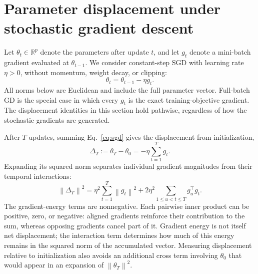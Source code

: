 \documentclass[11pt]{article}
\newcommand{\norm}[1]{\left\lVert#1\right\rVert}
\begin{document}
\section{Parameter displacement under stochastic gradient descent}

Let $\theta_t\in\mathbb{R}^p$ denote the parameters after update $t$, and let
$g_t$ denote a mini-batch gradient evaluated at $\theta_{t-1}$. We consider
constant-step SGD with learning rate $\eta>0$, without momentum, weight decay,
or clipping:
\begin{equation}
  \theta_t=\theta_{t-1}-\eta g_t.
  \label{eq:sgd}
\end{equation}
All norms below are Euclidean and include the full parameter vector. Full-batch
GD is the special case in which every $g_t$ is the exact training-objective
gradient. The displacement identities in this section hold pathwise, regardless
of how the stochastic gradients are generated.

After $T$ updates, summing Eq.~\eqref{eq:sgd} gives the displacement from
initialization,
\begin{equation}
  \Delta_T:=\theta_T-\theta_0=-\eta\sum_{t=1}^T g_t.
  \label{eq:displacement}
\end{equation}
Expanding its squared norm separates individual gradient magnitudes from their
temporal interactions:
\begin{equation}
  \boxed{\norm{\Delta_T}^2
  =\eta^2\sum_{t=1}^T\norm{g_t}^2
   +2\eta^2\sum_{1\leq u<t\leq T}g_u^\top g_t.}
  \label{eq:energy-interaction}
\end{equation}
The gradient-energy terms are nonnegative. Each pairwise inner product can be
positive, zero, or negative: aligned gradients reinforce their contribution to
the sum, whereas opposing gradients cancel part of it. Gradient energy is not
itself net displacement; the interaction term determines how much of this energy
remains in the squared norm of the accumulated vector. Measuring displacement
relative to initialization also avoids an additional cross term involving
$\theta_0$ that would appear in an expansion of $\norm{\theta_T}^2$.
\end{document}
